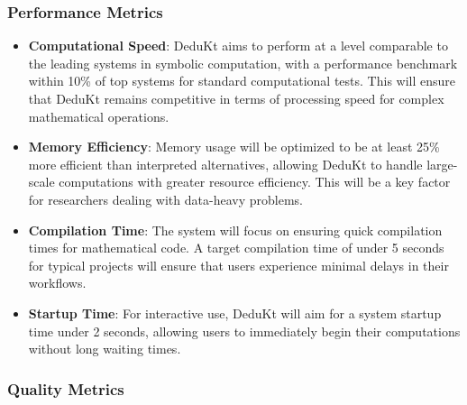 \subsubsection{Performance Metrics}

\begin{itemize}
    \item \textbf{Computational Speed}: DeduKt aims to perform at a level comparable to the leading systems in symbolic computation, with a performance benchmark within 10\% of top systems for standard computational tests.
    This will ensure that DeduKt remains competitive in terms of processing speed for complex mathematical operations.

    \item \textbf{Memory Efficiency}: Memory usage will be optimized to be at least 25\% more efficient than interpreted alternatives, allowing DeduKt to handle large-scale computations with greater resource efficiency.
    This will be a key factor for researchers dealing with data-heavy problems.

    \item \textbf{Compilation Time}: The system will focus on ensuring quick compilation times for mathematical code.
    A target compilation time of under 5 seconds for typical projects will ensure that users experience minimal delays in their workflows.

    \item \textbf{Startup Time}: For interactive use, DeduKt will aim for a system startup time under 2 seconds, allowing users to immediately begin their computations without long waiting times.
\end{itemize}

\subsubsection{Quality Metrics}

